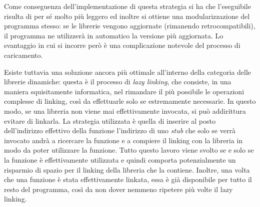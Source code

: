 Come conseguenza dell'implementazione di questa strategia si ha che l'eseguibile risulta di per sé molto più leggero ed inoltre si ottiene una modularizzazione del programma stesso: se le librerie vengono aggiornate (rimanendo retrocompatibili), il programma ne utilizzerà in automatico la versione più aggiornata. Lo svantaggio in cui si incorre però è una complicazione notevole del processo di caricamento.

Esiste tuttavia una soluzione ancora più ottimale all'interno della categoria delle librerie dinamiche: questa è il processo di \emph{lazy linking}, che consiste, in una maniera squisitamente informatica, nel rimandare il più possibile le operazioni complesse di linking, così da effettuarle solo se estremamente necessarie. In questo modo, se una libreria non viene mai effettivamente invocata, si può addirittura evitare di linkarla. La strategia utilizzata è quella di inserire al posto dell'indirizzo effettivo della funzione l'indirizzo di uno \emph{stub} che solo se verrà invocato andrà a ricercare la funzione e a compiere il linking con la libreria in modo da poter utilizzare la funzione. Tutto questo lavoro viene svolto se e solo se la funzione è effettivamente utilizzata e quindi comporta potenzialmente un risparmio di spazio per il linking della libreria che la contiene. Inoltre, una volta che una funzione è stata effettivamente linkata, essa è già disponibile per tutto il resto del programma, così da non dover nemmeno ripetere più volte il lazy linking.

